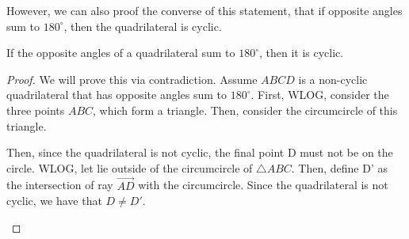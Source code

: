 However, we can also proof the converse of this statement, that if opposite angles sum to $180^\circ$, then the quadrilateral is cyclic.

\begin{lemma}
If the opposite angles of a quadrilateral sum to $180^\circ$, then it is cyclic.
\end{lemma}
\begin{proof}
We will prove this via contradiction. Assume $ABCD$ is a non-cyclic quadrilateral that has opposite angles sum to $180^\circ$. First, WLOG, consider the three points $ABC$, which form a triangle. Then, consider the circumcircle of this triangle. 

\begin{center}
\end{center}
Then, since the quadrilateral is not cyclic, the final point D must not be on the circle. WLOG, let lie outside of the circumcircle of $\triangle ABC$. Then, define D' as the intersection of ray $\vec{AD}$ with the circumcircle. Since the quadrilateral is not cyclic, we have that $D \neq D'$. 

\begin{center}
\end{center}
\end{proof}
